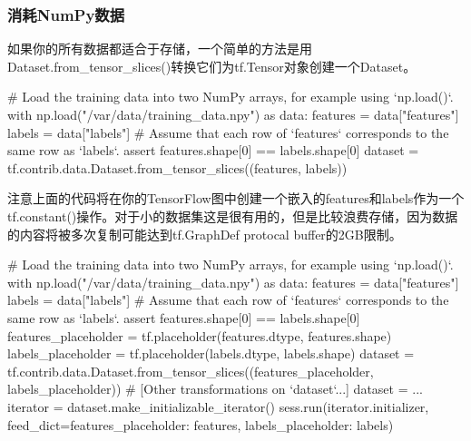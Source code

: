\subsubsection{消耗NumPy数据}
如果你的所有数据都适合于存储，一个简单的方法是用Dataset.from\_tensor\_slices()转换它们为tf.Tensor对象创建一个Dataset。
\begin{python}
# Load the training data into two NumPy arrays, for example using `np.load()`.
with np.load("/var/data/training_data.npy") as data:
    features = data["features"]
    labels = data["labels"]
# Assume that each row of `features` corresponds to the same row as `labels`.
assert features.shape[0] == labels.shape[0]
dataset = tf.contrib.data.Dataset.from_tensor_slices((features, labels))
\end{python}
注意上面的代码将在你的TensorFlow图中创建一个嵌入的features和labels作为一个tf.constant()操作。对于小的数据集这是很有用的，但是比较浪费存储，因为数据的内容将被多次复制可能达到tf.GraphDef protocal buffer的2GB限制。
\begin{python}
# Load the training data into two NumPy arrays, for example using `np.load()`.
with np.load("/var/data/training_data.npy") as data:
    features = data["features"]
    labels = data["labels"]
    # Assume that each row of `features` corresponds to the same row as `labels`.
assert features.shape[0] == labels.shape[0]
features_placeholder = tf.placeholder(features.dtype, features.shape)
labels_placeholder = tf.placeholder(labels.dtype, labels.shape)
dataset = tf.contrib.data.Dataset.from_tensor_slices((features_placeholder, labels_placeholder))
# [Other transformations on `dataset`...]
dataset = ...
iterator = dataset.make_initializable_iterator()
sess.run(iterator.initializer, feed_dict={features_placeholder: features,
                                        labels_placeholder: labels})
\end{python}
